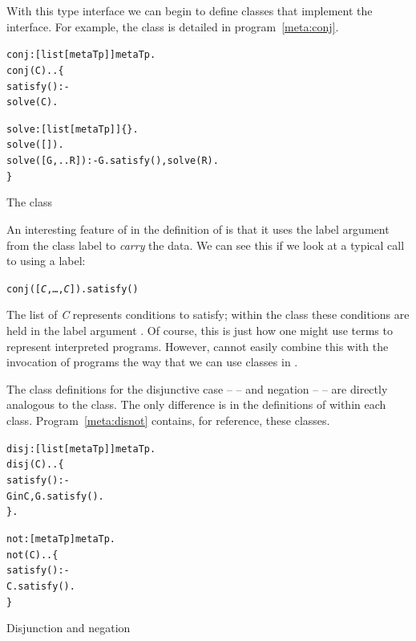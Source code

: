 With this type interface we can begin to define classes that implement the  interface. For example, the  class is detailed in program~\vref{meta:conj}.
\begin{program}
\vspace{0.5ex}
\begin{alltt}
conj:[list[metaTp]]\conarrow{}metaTp.
conj(C)..\{
  satisfy() :-
    solve(C).
  
  solve:[list[metaTp]]\{\}.
  solve([]).
  solve([G,..R]) :- G.satisfy(), solve(R).
\}
\end{alltt}
\vspace{-2ex}
\caption{The  class}
\label{meta:conj}
\end{program}
An interesting feature of  in the definition of  is that it uses the label argument  from the class label to \emph{carry} the data. We can see this if we look at a typical call to  using a  label:
\begin{alltt}
conj([\emph{C},\ldots,\emph{C\subn}]).satisfy()
\end{alltt}
The list of \emph{C\subi} represents conditions to satisfy; within the  class these conditions are held in the label argument . Of course, this is just how one might use \prolog terms to represent interpreted programs. However, \prolog cannot easily combine this with the invocation of programs the way that we can use classes in \go.

The class definitions for the disjunctive case --  -- and negation --  -- are directly analogous to the  class. The only difference is in the definitions of  within each class. Program~\vref{meta:disnot} contains, for reference, these classes.
\begin{program}
\vspace{0.5ex}
\begin{alltt}
disj:[list[metaTp]]\conarrow{}metaTp.
disj(C)..\{
  satisfy() :-
    G in C, G.satisfy().
\}.

not:[metaTp]\conarrow{}metaTp.
not(C)..\{
  satisfy() :-
    \nasf{} C.satisfy().
\}
\end{alltt}
\vspace{-2ex}
\caption{Disjunction and negation}
\label{meta:disnot}
\end{program}

